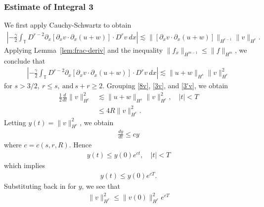 \documentclass[12pt,reqno]{amsart}
\numberwithin{equation}{section}  %
\numberwithin{figure}{section}
\newcommand{\ci}{\mathbb{T}}
\newcommand{\p}{\partial}
\begin{document}
\subsubsection{Estimate of Integral 3} We first apply
Cauchy-Schwartz to obtain
%
%
\begin{equation*}
\begin{split}
\left | - \frac{\gamma}{2} \int_{\ci} D^{r 
-2} \p_x [ \p_x v
\cdot \p_x (u+w)]\cdot D^r v \ dx \right | 
\lesssim 
\|[\p_x v \cdot \p_x (u+w)] \|_{H^{r -1}}
\|v\|_{H^r}.
\end{split}
\end{equation*}
%
%
Applying Lemma~\ref{lem:frac-deriv} and the inequality $\| f_{x}
\|_{H^{m-1}} \le \| f \|_{H^{m}}$,  we conclude that
%
\begin{equation}
\begin{split}
\left | - \frac{\gamma}{2} \int_{\ci} D^{r 
-2} \p_x [ \p_x v
\cdot \p_x (u+w)]\cdot D^r v \ dx \right | 
\lesssim \|u+w \|_{H^{s}}
\|v\|_{H^r}^2
\label{3'v}
\end{split}
\end{equation}
%
%
for $s > 3/2, \ r \le s, \ \text{and} \ s + r \ge 2$.
%
%
%
%
Grouping \eqref{8v}, \eqref{3v}, and \eqref{3'v}, we obtain
%
%
\begin{equation}
\begin{split}
\frac{1}{2} \frac{d}{dt}
\|v\|_{H^r}^2
& \lesssim \|u+w\|_{H^s}
\|v\|_{H^r}^2, \quad | t | < T
\\
& \le 4R \| v \|_{H^{r}}^{2}.
\label{9v}
\end{split}
\end{equation}
%
%
%
%
%
Letting $y(t) = \| v \|^{2}_{H^{r}}$, we obtain
%
%
%
\begin{equation*}
\begin{split}
\frac{dy}{dt} \le cy
\end{split}
\end{equation*}
%
where $c = c(s, r, R)$. Hence
%
%
\begin{equation*}
\begin{split}
y(t) \le y(0) e^{ct}, \quad | t | < T
\end{split}
\end{equation*}
%
%
which implies
%
%
\begin{equation*}
\begin{split}
y(t) \le y(0) e^{cT}.
\end{split}
\end{equation*}
%
%
Substituting back in for $y$, we see that
%
%
\begin{equation*}
\begin{split}
\| v \|_{H^{r}}^{2} \le \| v(0) \|^{2}_{H^{r}} e^{cT}
\end{split}
\end{equation*}
\end{document}
